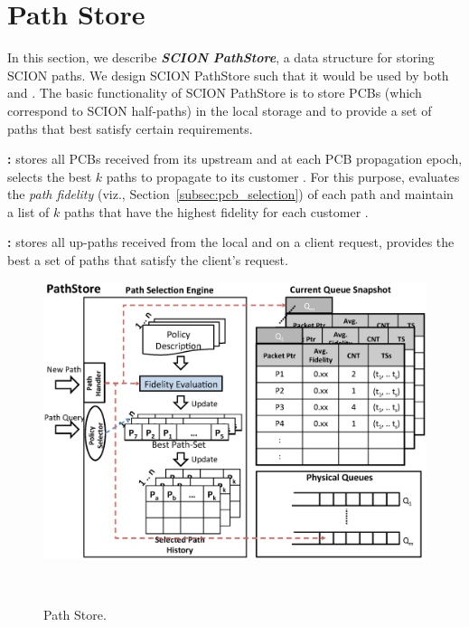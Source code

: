 \newcommand{\sps}{SCION PathStore\@\xspace}
\newcommand{\pse}{path-selection engine\@\xspace}
\newcommand{\PSE}{Path-selection Engine\@\xspace}
\newcommand{\qs}{queue snapshot\@\xspace}
\newcommand{\QS}{Queue Snapshot\@\xspace}
\newcommand{\sq}{SCION queue\@\xspace}
\newcommand{\SQ}{SCION Queue\@\xspace}
\newcommand{\BPS}{Best-path Set\@\xspace}
\newcommand{\bps}{best-path set\@\xspace}
\newcommand{\stride}{STRIDE\@\xspace}

\section{Path Store}
In this section, we describe {\em \bf SCION PathStore}, a data structure for storing SCION paths. We design \sps such that it would be used by both \BS and \CS.
The basic functionality of \sps is to store PCBs (which correspond to
SCION half-paths) in the local storage and to provide a set of paths
that best satisfy certain requirements.

{\bf \BS: } \BS stores all PCBs received from its upstream \ADs and at
each PCB propagation epoch, selects the best $k$ paths to propagate to
its customer \ADs. For this purpose, \BS evaluates the {\em path
  fidelity} (viz., Section~\ref{subsec:pcb_selection}) of each path
and maintain a list of $k$ paths that have the highest fidelity for
each customer \AD.

{\bf \PS: } \PS stores all up-paths received from the local \BS and on a client request, provides the best a set of paths that satisfy the client's request.

\begin{figure}[th]
\centering
\includegraphics[width=.9\columnwidth]{./fig/path_store.eps}
\caption{Path Store.}~\label{fig:path_store}
\end{figure}

